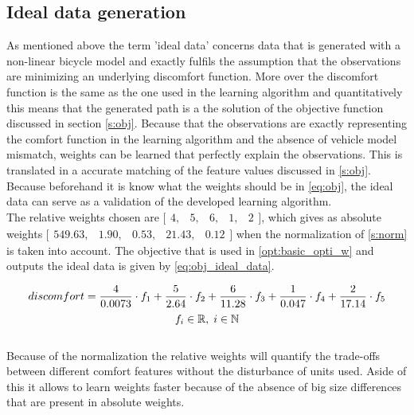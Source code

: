 \subsection{Ideal data generation} \label{s:GD}
As mentioned above the term 'ideal data' concerns data that is generated with a non-linear bicycle model and exactly fulfils the assumption that the observations are minimizing an underlying discomfort function. More over the discomfort function is the same as the one used in the learning algorithm and quantitatively this means that the generated path is a the solution of the objective function discussed in section \ref{s:obj}. Because that the observations are exactly representing the comfort function in the learning algorithm and the absence of vehicle model mismatch, weights can be learned that perfectly explain the observations. This is translated in a accurate matching of the feature values discussed in \ref{s:obj}. Because beforehand it is know what the weights should be in \ref{eq:obj}, the ideal data can serve as a validation of the developed learning algorithm.\\

The relative weights chosen are $ \bigl[ \begin{smallmatrix} 4,&5,&6,&1,&2\end{smallmatrix}\bigr]$, which gives as absolute weights  $ \bigl[ \begin{smallmatrix} 549.63, &1.90, &0.53,  &21.43, &0.12\end{smallmatrix}\bigr]$ when the normalization of \ref{s:norm} is taken into account. The objective that is used in \ref{opt:basic_opti_w} and outputs the ideal data is given by \ref{eq:obj_ideal_data}.

\begin{equation}\label{eq:obj_ideal_data}
discomfort = \frac{4}{0.0073} \cdot f_1 +\frac{5}{2.64} \cdot f_2 +\frac{6}{11.28} \cdot f_3 +\frac{1}{0.047} \cdot f_4 +\frac{2}{17.14} \cdot f_5 \\
\end{equation}
\[	f_i \in \mathbb{R}, \hspace{1mm}
i \in \mathbb{N}\]\\

Because of the normalization the relative weights will quantify the trade-offs between different comfort features without the disturbance of units used. Aside of this it allows to learn weights faster because of the absence of big size differences that are present in absolute weights.



